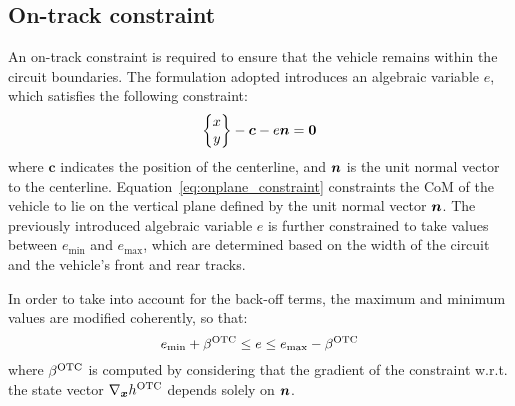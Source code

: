 \subsection{On-track constraint}
\label{sec:ontrack_constraint}
An on-track constraint is required to ensure that the vehicle remains within the circuit boundaries. The formulation adopted introduces an algebraic variable $e$, which satisfies the following constraint:
\begin{equation}
	\begin{Bmatrix}
		x\\y
	\end{Bmatrix}
	-\boldsymbol{c} - e\bn=\boldsymbol{0} \label{eq:onplane_constraint}
\end{equation}
where $\boldsymbol{c}$ indicates the position of the centerline, and $\boldsymbol{n}$ is the unit normal vector to the centerline. Equation~\eqref{eq:onplane_constraint} constraints the CoM of the vehicle to lie on the vertical plane defined by the unit normal vector $\boldsymbol{n}$. The previously introduced algebraic variable $e$ is further constrained to take values between $e_\textrm{min}$ and $e_\textrm{max}$, which are determined based on the width of the circuit and the vehicle's front and rear tracks.

In order to take into account for the back-off terms, the maximum and minimum values are modified coherently, so that:
\begin{equation}
	e_\textrm{min} + \be^\textrm{OTC} \leq e \leq e_\textrm{max} - \be^\textrm{OTC}\label{eq:ontrack_constraint}
\end{equation}
where $\beta^\textrm{OTC}$ is computed by considering that the gradient of the constraint w.r.t. the state vector $\nabla_{\boldsymbol{x}}h^\textrm{OTC}$ depends solely on $\boldsymbol{n}$.
